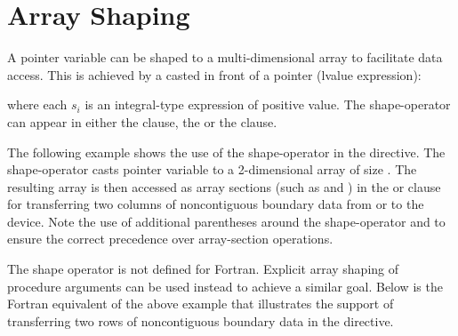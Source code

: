 \section{Array Shaping}
\label{sec:array-shaping}



\begin{ccppspecific}
A pointer variable can be shaped to a multi-dimensional array to facilitate
data access. This is achieved by a  casted in front of 
a pointer (lvalue expression):
\begin{description}
\item[]\hspace*{5mm}
\end{description}
where each $s_i$ is an integral-type expression of positive value.
The shape-operator can appear in either the  clause, the
 or the  clause.

The following example shows the use of the shape-operator in the 
 directive. The shape-operator \ucode{([nx][ny+2])}
casts pointer variable  to a 2-dimensional array of size
.  The resulting array is then accessed as
array sections (such as \ucode{[0:nx][1]} and \ucode{[0:nx][ny]}) 
in the  or  clause for transferring two columns of 
noncontiguous boundary data from or to the device.  
Note the use of additional parentheses
around the shape-operator and  to ensure the correct precedence 
over array-section operations.

\end{ccppspecific}

\begin{fortranspecific}
The shape operator is not defined for Fortran.  Explicit array shaping
of procedure arguments can be used instead to achieve a similar goal.
Below is the Fortran equivalent of the above example that illustrates
the support of transferring two rows of noncontiguous boundary
data in the  directive.
 
\end{fortranspecific}
